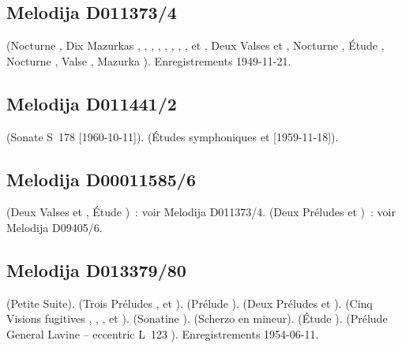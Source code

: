 \subsection{Melodija D011373/4}

\Chopin{} (Nocturne  , Dix Mazurkas  ,
 ,  ,  , 
,  ,  ,  ,
  et  , Deux Valses 
 et  , Nocturne  , Étude
 , Nocturne  , Valse 
, Mazurka  ).
Enregistrements 1949-11-21.

\subsection{Melodija D011441/2}

\Liszt{} (Sonate S~178 [1960-10-11]).
\Schumann{} (Études symphoniques  et  [1959-11-18]).

\subsection{Melodija D00011585/6}

\Chopin{} (Deux Valses   et  , Étude
 )~: voir Melodija D011373/4.
\Rachmaninov{} (Deux Préludes   et 
)~: voir Melodija D09405/6.

\subsection{Melodija D013379/80}

\Borodine{} (Petite Suite).
\Liadov{} (Trois Préludes  ,   et
 ).
\Rachmaninov{} (Prélude  ).
\Scriabine{} (Deux Préludes   et  ).
\Prokofiev{} (Cinq Visions fugitives  , 
,  ,   et 
).
\Kabalevski{} (Sonatine  ).
\Goltz{} (Scherzo en \kE mineur).
\Mendelssohn{} (Étude  ).
\Debussy{} (Prélude General Lavine -- eccentric L~123 ).
Enregistrements 1954-06-11.

